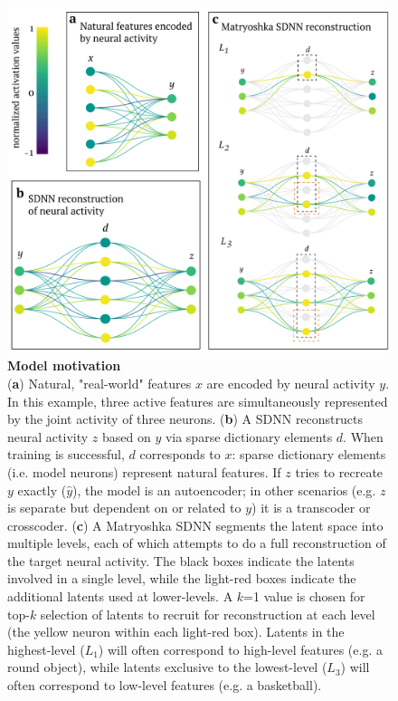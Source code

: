 \begin{figure}[htbp]
    \begin{minipage}{0.63\linewidth}
    \includegraphics[width=\linewidth]{figures/sdnn_arch.pdf}
    \end{minipage}%
    \begin{minipage}{0.37\linewidth}
    \caption{
        \textbf{Model motivation} \\
        \small
        (\textbf{a}) Natural, "real-world" features $x$ are encoded by neural activity $y$. In this example, three active features are simultaneously represented by the joint activity of three neurons. (\textbf{b}) A SDNN reconstructs neural activity $z$ based on $y$ via sparse dictionary elements $d$. When training is successful, $d$ corresponds to $x$: sparse dictionary elements (i.e. model neurons) represent natural features. If $z$ tries to recreate $y$ exactly ($\hat{y}$), the model is an autoencoder; in other scenarios (e.g. $z$ is separate but dependent on or related to $y$) it is a transcoder or crosscoder. (\textbf{c}) A Matryoshka SDNN segments the latent space into multiple levels, each of which attempts to do a full reconstruction of the target neural activity. The black boxes indicate the latents involved in a single level, while the light-red boxes indicate the additional latents used at lower-levels. A $k$=1 value is chosen for top-$k$ selection of latents to recruit for reconstruction at each level (the yellow neuron within each light-red box). Latents in the highest-level ($L_1$) will often correspond to high-level features (e.g. a round object), while latents exclusive to the lowest-level ($L_3$) will often correspond to low-level features (e.g. a basketball).
    }
    \label{figure:sdnn_arch}
    \end{minipage}
\end{figure}

